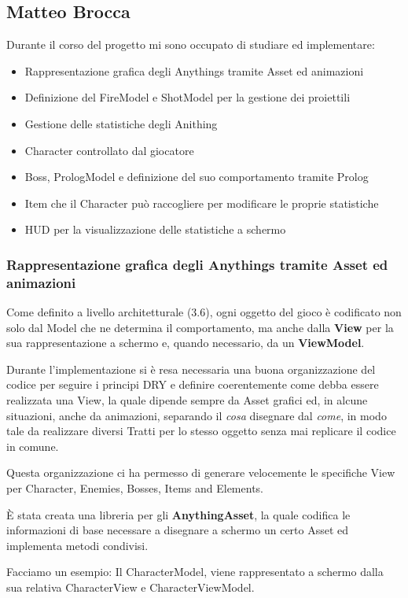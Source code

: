 \subsection{Matteo Brocca}
Durante il corso del progetto mi sono occupato di studiare ed implementare:
\begin{itemize}
	\item Rappresentazione grafica degli Anythings tramite Asset ed animazioni
    \item Definizione del FireModel e ShotModel per la gestione dei proiettili
    \item Gestione delle statistiche degli Anithing
    \item Character controllato dal giocatore
    \item Boss, PrologModel e definizione del suo comportamento tramite Prolog
    \item Item che il Character può raccogliere per modificare le proprie statistiche
    \item HUD per la visualizzazione delle statistiche a schermo
\end{itemize}

\subsubsection{Rappresentazione grafica degli Anythings tramite Asset ed animazioni}
Come definito a livello architetturale (3.6), ogni oggetto del gioco è codificato non solo dal Model che ne determina il comportamento,
ma anche dalla \textbf{View} per la sua rappresentazione a schermo e, quando necessario, da un \textbf{ViewModel}.

Durante l'implementazione si è resa necessaria una buona organizzazione del codice per seguire i principi DRY 
e definire coerentemente come debba essere realizzata una View, la quale dipende sempre da Asset grafici 
ed, in alcune situazioni, anche da animazioni, separando il \textit{cosa} disegnare dal \textit{come}, 
in modo tale da realizzare diversi Tratti per lo stesso oggetto senza mai replicare il codice in comune.

Questa organizzazione ci ha permesso di generare velocemente le specifiche View per Character, Enemies, Bosses, Items and Elements.

È stata creata una libreria per gli \textbf{AnythingAsset}, la quale codifica le informazioni di base necessare  a disegnare a schermo un certo Asset ed implementa metodi condivisi.

Facciamo un esempio:
Il CharacterModel, viene rappresentato a schermo dalla sua relativa CharacterView e CharacterViewModel.

